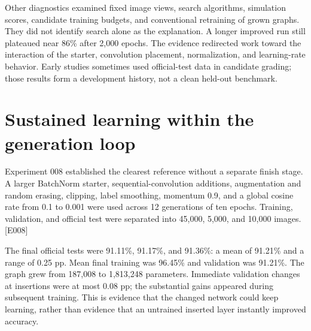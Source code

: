 \documentclass[11pt,a4paper]{article}
\newcommand{\ev}[1]{\textcolor{ink}{\small[#1]}}
\begin{document}
Other diagnostics examined fixed image views, search algorithms, simulation scores, candidate training budgets, and conventional retraining of grown graphs. They did not identify search alone as the explanation. A longer improved run still plateaued near 86\% after 2,000 epochs. The evidence redirected work toward the interaction of the starter, convolution placement, normalization, and learning-rate behavior. Early studies sometimes used official-test data in candidate grading; those results form a development history, not a clean held-out benchmark.

\newpage
\section{Sustained learning within the generation loop}
Experiment 008 established the clearest reference without a separate finish stage. A larger BatchNorm starter, sequential-convolution additions, augmentation and random erasing, clipping, label smoothing, momentum 0.9, and a global cosine rate from 0.1 to 0.001 were used across 12 generations of ten epochs. Training, validation, and official test were separated into 45,000, 5,000, and 10,000 images. \ev{E008}

\begin{center}
\end{center}

The final official tests were 91.11\%, 91.17\%, and 91.36\%: a mean of 91.21\% and a range of 0.25 pp. Mean final training was 96.45\% and validation was 91.21\%. The graph grew from 187,008 to 1,813,248 parameters. Immediate validation changes at insertions were at most 0.08 pp; the substantial gains appeared during subsequent training. This is evidence that the changed network could keep learning, rather than evidence that an untrained inserted layer instantly improved accuracy.
\end{document}
